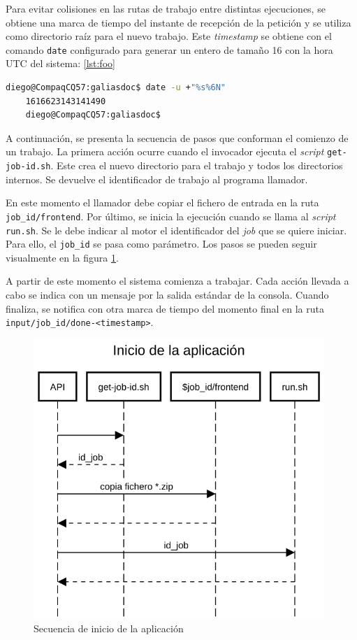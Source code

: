 Para evitar colisiones en las rutas de trabajo entre distintas ejecuciones, se obtiene una marca de tiempo del instante de recepción de la petición y se utiliza como directorio raíz para el nuevo trabajo. Este \emph{timestamp} se obtiene con el comando \verb|date| configurado para generar un entero de tamaño 16 con la hora UTC del sistema: \ref{lst:foo}

\begin{lstlisting}[language=bash,caption={Obtención del identificador del trabajo},label=lst:identificador-trabajo]
    diego@CompaqCQ57:galiasdoc$ date -u +"%s%6N"
    1616623143141490
    diego@CompaqCQ57:galiasdoc$
\end{lstlisting}

A continuación, se presenta la secuencia de pasos que conforman el comienzo de un trabajo. La primera acción ocurre cuando el invocador ejecuta el \emph{script} \verb|get-job-id.sh|. Este crea el nuevo directorio para el trabajo y todos los directorios internos. Se devuelve el identificador de trabajo al programa llamador.

En este momento el llamador debe copiar el fichero de entrada en la ruta \verb|job_id/frontend|. Por último, se inicia la ejecución cuando se llama al \emph{script} \verb|run.sh|. Se le debe indicar al motor el identificador del \emph{job} que se quiere iniciar. Para ello, el \verb|job_id| se pasa como parámetro. Los pasos se pueden seguir visualmente en la figura \ref{fig:inicio-aplicacion}.

A partir de este momento el sistema comienza a trabajar. Cada acción llevada a cabo se indica con un mensaje por la salida estándar de la consola. Cuando finaliza, se notifica con otra marca de tiempo del momento final en la ruta \verb|input/job_id/done-<timestamp>|.

\begin{figure}[hp!]
    \centering
    \includegraphics[width=11cm]{imaxes/inicio-aplicacion.png}
    \caption{Secuencia de inicio de la aplicación}
    \label{fig:inicio-aplicacion}
\end{figure}

